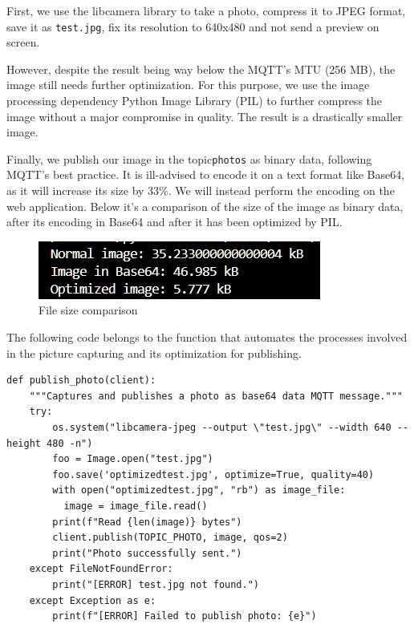 First, we use the libcamera library to take a photo, compress it to JPEG format, save it as \lstinline|test.jpg|, fix its resolution to 640x480 and not send a preview on screen.

However, despite the result being way below the MQTT's MTU (256 MB), the image still needs further optimization. For this purpose, we use the image processing dependency Python Image Library (PIL) to further compress the image without a major compromise in quality. The result is a drastically smaller image. 

Finally, we publish our image in the topic\lstinline|photos| as binary data, following MQTT's best practice. It is ill-advised to encode it on a text format like Base64, as it will increase its size by 33\%. We will instead perform the encoding on the web application. Below it's a comparison of the size of the image as binary data, after its encoding in Base64 and after it has been optimized by PIL.
\begin{figure}[H]
    \centering
    \includegraphics[width=0.5\linewidth]{Hauptkapitel/Pictures/opt_img.jpg}
    \caption{File size comparison}
    \label{fig:opt_img}
\end{figure}
The following code belongs to the function that automates the processes involved in the picture capturing and its optimization for publishing.

\begin{lstlisting}[style=courier12]
def publish_photo(client):
    """Captures and publishes a photo as base64 data MQTT message."""
    try:
        os.system("libcamera-jpeg --output \"test.jpg\" --width 640 --height 480 -n")
        foo = Image.open("test.jpg")
        foo.save('optimizedtest.jpg', optimize=True, quality=40)
        with open("optimizedtest.jpg", "rb") as image_file:
          image = image_file.read()
        print(f"Read {len(image)} bytes")
        client.publish(TOPIC_PHOTO, image, qos=2)
        print("Photo successfully sent.")
    except FileNotFoundError:
        print("[ERROR] test.jpg not found.")
    except Exception as e:
        print(f"[ERROR] Failed to publish photo: {e}")
\end{lstlisting}



 



 

